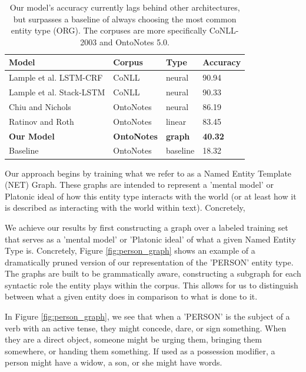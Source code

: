 \documentclass[11pt,a4paper]{article}
\begin{document}
\begin{table}[t]
\begin{tabular}{@{}llll@{}}
\toprule
Model              & Corpus          & Type           & Accuracy        \\ \midrule
Lample et al. LSTM-CRF   &  CoNLL   & neural         & 90.94         \\
Lample et al. Stack-LSTM      &  CoNLL   & neural         & 90.33          \\
Chiu and Nichols   & OntoNotes          & neural         & 86.19          \\
Ratinov and Roth   & OntoNotes          & linear         & 83.45          \\ \midrule
\textbf{Our Model} & \textbf{OntoNotes} & \textbf{graph} & \textbf{40.32} \\ \midrule
Baseline           & OntoNotes          & baseline       & 18.32         
\end{tabular}
\label{tab:state_of_art}
\caption{Our model's accuracy currently lags behind other architectures, but surpasses a baseline of always choosing the most common entity type (ORG). The corpuses are more specifically CoNLL-2003 and OntoNotes 5.0.}
\end{table}

Our approach begins by training what we refer to as a Named Entity Template (NET) Graph. These graphs are intended to represent a 'mental model' or Platonic ideal of how this entity type interacts with the world (or at least how it is described as interacting with the world within text). Concretely, 

We achieve our results by first constructing a graph over a labeled training set that serves as a 'mental model' or 'Platonic ideal' of what a given Named Entity Type is. Concretely, Figure \ref{fig:person_graph} shows an example of a dramatically pruned version of our representation of the 'PERSON' entity type. The graphs are built to be grammatically aware, constructing a subgraph for each syntactic role the entity plays within the corpus. This allows for us to distinguish between what a given entity does in comparison to what is done to it.

In Figure \ref{fig:person_graph}, we see that when a 'PERSON' is the subject of a verb with an active tense, they might concede, dare, or sign something. When they are a direct object, someone might be urging them, bringing them somewhere, or handing them something. If used as a possession modifier, a person might have a widow, a son, or she might have words.
\end{document}
